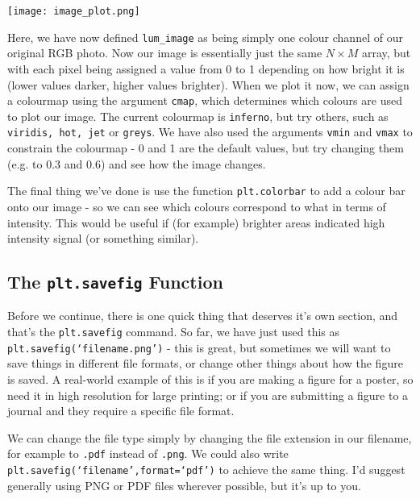 \documentclass[10pt,a4paper]{memoir}
\begin{document}
\begin{minipage}{0.48\textwidth}
\end{minipage}
\quad
\begin{minipage}{0.48\textwidth}
		\centering
		\texttt{[image: image\_plot.png]}
\end{minipage}

Here, we have now defined \texttt{lum\_image} as being simply one colour channel of our original RGB photo. Now our image is essentially just the same $N\times M$ array, but with each pixel being assigned a value from 0 to 1 depending on how bright it is (lower values darker, higher values brighter). When we plot it now, we can assign a colourmap using the argument \texttt{cmap}, which determines which colours are used to plot our image. The current colourmap is \texttt{inferno}, but try others, such as \texttt{viridis, hot, jet} or \texttt{greys}. We have also used the arguments \texttt{vmin} and \texttt{vmax} to constrain the colourmap - 0 and 1 are the default values, but try changing them (e.g. to 0.3 and 0.6) and see how the image changes. 

The final thing we've done is use the function \texttt{plt.colorbar} to add a colour bar onto our image - so we can see which colours correspond to what in terms of intensity. This would be useful if (for example) brighter areas indicated high intensity signal (or something similar).

\subsection{The \texttt{plt.savefig} Function}
Before we continue, there is one quick thing that deserves it's own section, and that's the \texttt{plt.savefig} command. So far, we have just used this as \texttt{plt.savefig(`filename.png')} - this is great, but sometimes we will want to save things in different file formats, or change other things about how the figure is saved. A real-world example of this is if you are making a figure for a poster, so need it in high resolution for large printing; or if you are submitting a figure to a journal and they require a specific file format.

We can change the file type simply by changing the file extension in our filename, for example to \texttt{.pdf} instead of \texttt{.png}. We could also write \texttt{plt.savefig(`filename',format=`pdf')} to achieve the same thing. I'd suggest generally using PNG or PDF files wherever possible, but it's up to you. 
\end{document}

